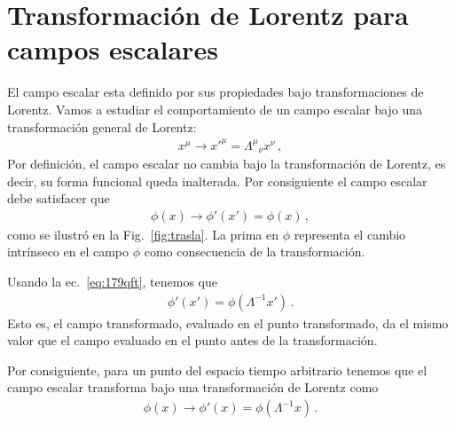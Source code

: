 \section{Transformación de Lorentz para campos escalares}

\begin{frame}
El campo escalar esta definido por sus propiedades bajo transformaciones de Lorentz. Vamos a estudiar el comportamiento de un campo escalar bajo una transformación general de Lorentz:
\begin{align}
\label{eq:179qft}
  x^\mu\to {x'}^\mu={\Lambda^\mu}_\nu x^\nu\,,
\end{align}
Por definición, el campo escalar no cambia bajo la transformación de Lorentz, es decir, su forma funcional queda inalterada. Por consiguiente el campo escalar debe satisfacer que
\begin{align}
 \phi(x)\to  \phi'(x')=\phi(x)\,,
\end{align}
como se ilustró en la Fig.~\ref{fig:trasla}. La prima en $\phi$ representa el cambio intrínseco en el campo $\phi$ como consecuencia de la transformación.


Usando la ec.~\eqref{eq:179qft}, tenemos que
\begin{align}
    \phi'(x')=\phi(\Lambda^{-1}x')\,.
\end{align}
Esto es, el campo transformado, evaluado en el punto transformado, da el mismo valor que el campo evaluado en el punto antes de la transformación.
\end{frame}

\begin{frame}

Por consiguiente, para un punto del espacio tiempo arbitrario tenemos
que el campo escalar transforma bajo una transformación de Lorentz como
\begin{align}
  \label{eq:scalarlorentz}
 \phi(x)\to  \phi'(x)=\phi(\Lambda^{-1}x)\,.
\end{align}
\end{frame}







